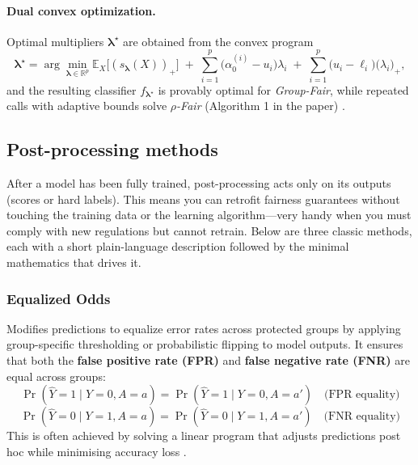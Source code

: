 \documentclass[12pt,a4paper,openright,twoside]{book}
\begin{document}
\paragraph{Dual convex optimization.}
Optimal multipliers $\boldsymbol\lambda^\star$ are obtained from the convex program \cite{celis2020classificationfairnessconstraintsmetaalgorithm}
\[
\boldsymbol\lambda^\star=\arg\min_{\boldsymbol\lambda\in\mathbb{R}^p}
    \mathbb{E}_X\!\bigl[(s_{\boldsymbol\lambda}(X))_+\bigr]
    \;+\;
    \sum_{i=1}^{p}\bigl(\alpha^{(i)}_0-u_i\bigr)\lambda_i
    \;+\;
    \sum_{i=1}^{p}\bigl(u_i-\ell_i\bigr)\bigl(\lambda_i\bigr)_+,
\]
and the resulting classifier $f_{\boldsymbol\lambda^\star}$ is provably optimal for \emph{Group-Fair}, while repeated calls with adaptive bounds solve \emph{$\rho$-Fair} (Algorithm 1 in the paper) \cite{celis2020classificationfairnessconstraintsmetaalgorithm}.


\subsection{Post-processing methods} 
After a model has been fully trained, post-processing acts only on its outputs (scores or hard labels).
This means you can retrofit fairness guarantees without touching the training data or the learning algorithm—very handy when you must comply with new regulations but cannot retrain.
Below are three classic methods, each with a short plain-language description followed by the minimal mathematics that drives it.

\subsubsection{Equalized Odds} Modifies predictions to equalize error rates across protected groups by applying group-specific thresholding or probabilistic flipping to model outputs. It ensures that both the \textbf{false positive rate (FPR)} and \textbf{false negative rate (FNR)} are equal across groups:
\begin{equation}
    \Pr(\hat{Y} = 1 \mid Y = 0, A = a) = \Pr(\hat{Y} = 1 \mid Y = 0, A = a') \quad\text{(FPR equality)}
\end{equation}
\begin{equation}
    \Pr(\hat{Y} = 0 \mid Y = 1, A = a) = \Pr(\hat{Y} = 0 \mid Y = 1, A = a') \quad\text{(FNR equality)}
\end{equation}
This is often achieved by solving a linear program that adjusts predictions post hoc while minimising accuracy loss \cite{hardt2016equalityopportunitysupervisedlearning}.
\end{document}
